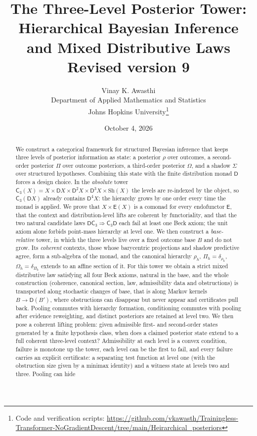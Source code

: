 \documentclass[11pt]{article}
\title{The Three-Level Posterior Tower:\\
Hierarchical Bayesian Inference and Mixed Distributive Laws\\[4pt]
\large Revised version 9}
\author{Vinay K. Awasthi\\
Department of Applied Mathematics and Statistics\\
Johns Hopkins University\thanks{Code and verification scripts:
\url{https://github.com/vkawasth/Trainingless-Transformer-NoGradientDescent/tree/main/Heirarchical_posteriors}}}
\date{October 4, 2026}
\theoremstyle{definition}
\theoremstyle{remark}
\newcommand{\D}{\mathsf{D}}
\newcommand{\Sh}{\mathrm{Sh}}
\newcommand{\C}{\mathsf{C}}
\newcommand{\E}{\mathsf{E}}
\begin{document}
\maketitle

\begin{abstract}
We construct a categorical framework for structured Bayesian inference that keeps three levels of
posterior information as state: a posterior $\rho$ over outcomes, a second-order posterior $\Pi$ over
outcome posteriors, a third-order posterior $\Omega$, and a shadow $\Sigma$ over structured hypotheses.
Combining this state with the finite distribution monad $\D$ forces a design choice. In the
\emph{absolute} tower $\C_3(X)=X\times\D X\times\D^2X\times\D^3X\times\Sh(X)$ the levels are
re-indexed by the object, so $\C_3(\D X)$ already contains $\D^4X$: the hierarchy grows by one order
every time the monad is applied. We prove that $X\times\E(X)$ is a comonad for every endofunctor $\E$,
that the context and distribution-level lifts are coherent by functoriality, and that the two natural
candidate laws $\D\C_3\Rightarrow\C_3\D$ each fail at least one Beck axiom; the unit axiom alone forbids
point-mass hierarchy at level one. We then construct a \emph{base-relative} tower, in which the three
levels live over a fixed outcome base $B$ and do not grow. Its \emph{coherent} contexts, those whose
barycentric projections and shadow predictive agree, form a sub-algebra of the monad, and the
canonical hierarchy $\rho_h$, $\Pi_h=\delta_{\rho_h}$, $\Omega_h=\delta_{\Pi_h}$ extends to an affine
section of it. For this tower we obtain a strict mixed distributive law satisfying all four Beck
axioms, natural in the base, and the whole construction (coherence, canonical section, law,
admissibility data and obstructions) is transported along stochastic changes of base, that is along
Markov kernels $B\to\D(B')$, where obstructions can disappear but never appear and certificates pull
back. Pooling commutes with hierarchy formation, conditioning commutes with
pooling after evidence reweighting, and distinct posteriors are retained at level two. We then pose a coherent lifting problem: given
admissible first- and second-order states generated by a finite hypothesis class, when does a claimed
posterior state extend to a full coherent three-level context? Admissibility at each level is a
convex condition, failure is monotone up the tower, each level can be the first to fail, and every
failure carries an explicit certificate: a separating test function at level one (with the obstruction
size given by a minimax identity) and a witness state at levels two and three. Pooling can hide

\end{abstract}
\end{document}

